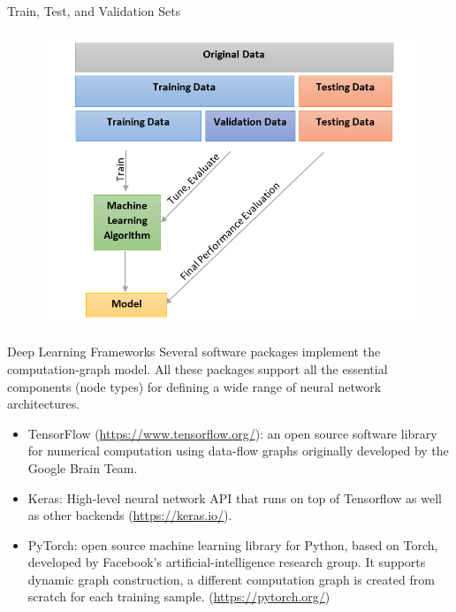 \documentclass[handout]{beamer}
\begin{document}
\begin{frame}{Train, Test, and Validation Sets}
\begin{scriptsize}

 \begin{figure}[htb]
	\centering
	 \includegraphics[scale=0.55]{pics/validation.png}
\end{figure}


\end{scriptsize}
\end{frame}


\begin{frame}{Deep Learning Frameworks}
Several software packages implement the computation-graph model. All these packages support all the essential components (node types) for defining a wide range of neural network architectures.
\begin{scriptsize}
\begin{itemize}
\item TensorFlow (\url{https://www.tensorflow.org/}): an open source software library for numerical computation using data-flow graphs originally developed by the Google Brain Team. 

\item Keras: High-level neural network API that runs on top of Tensorflow as well as other backends (\url{https://keras.io/}). 

\item PyTorch: open source machine learning library for Python, based on Torch, developed by Facebook's artificial-intelligence research group. It supports dynamic graph construction, a different computation graph is created from scratch for each training sample. (\url{https://pytorch.org/})


\end{itemize}
\end{scriptsize}
\end{frame}
\end{document}
